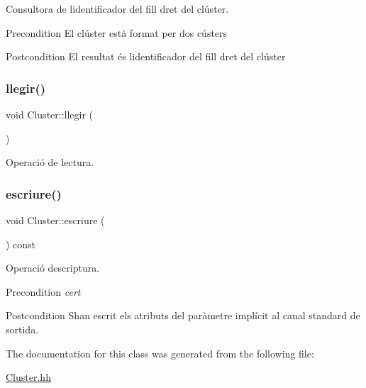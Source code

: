 Consultora de l\textquotesingle{}identificador del fill dret del clúster. 

\begin{DoxyPrecond}{Precondition}
El clúster està format per dos cústers 
\end{DoxyPrecond}
\begin{DoxyPostcond}{Postcondition}
El resultat és l\textquotesingle{}identificador del fill dret del clúster 
\end{DoxyPostcond}
\mbox{\label{class_cluster_addf8d8d2beb59cf5b5fd7e0eed491e7e}} 
\subsubsection{\texorpdfstring{llegir()}{llegir()}}
{\footnotesize\ttfamily void Cluster\+::llegir (\begin{DoxyParamCaption}{ }\end{DoxyParamCaption})}



Operació de lectura. 

\mbox{\label{class_cluster_aae67c144fc543eace946dc8a651b5b7a}} 
\subsubsection{\texorpdfstring{escriure()}{escriure()}}
{\footnotesize\ttfamily void Cluster\+::escriure (\begin{DoxyParamCaption}{ }\end{DoxyParamCaption}) const}



Operació d\textquotesingle{}escriptura. 

\begin{DoxyPrecond}{Precondition}
{\itshape cert} 
\end{DoxyPrecond}
\begin{DoxyPostcond}{Postcondition}
S\textquotesingle{}han escrit els atributs del paràmetre implícit al canal standard de sortida. 
\end{DoxyPostcond}


The documentation for this class was generated from the following file\+:\begin{DoxyCompactItemize}
\item 
\hyperlink{_cluster_8hh}{Cluster.\+hh}\end{DoxyCompactItemize}
